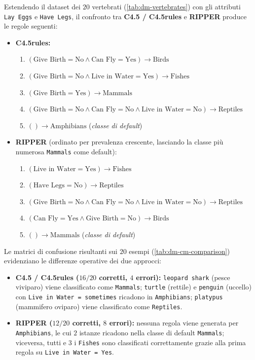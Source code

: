 Estendendo il dataset dei $20$ vertebrati (\autoref{tab:dm-vertebrates}) con gli attributi \texttt{Lay Eggs} e \texttt{Have Legs}, il confronto tra \textbf{C4.5 / C4.5rules} e \textbf{RIPPER} produce le regole seguenti:
\begin{itemize}
    \item \textbf{C4.5rules:}
    \begin{enumerate}
        \item $(\text{Give Birth}=\text{No} \wedge \text{Can Fly}=\text{Yes}) \rightarrow \text{Birds}$
        \item $(\text{Give Birth}=\text{No} \wedge \text{Live in Water}=\text{Yes}) \rightarrow \text{Fishes}$
        \item $(\text{Give Birth}=\text{Yes}) \rightarrow \text{Mammals}$
        \item $(\text{Give Birth}=\text{No} \wedge \text{Can Fly}=\text{No} \wedge \text{Live in Water}=\text{No}) \rightarrow \text{Reptiles}$
        \item $() \rightarrow \text{Amphibians}$ \quad (\textit{classe di default})
    \end{enumerate}
    \item \textbf{RIPPER} (ordinato per prevalenza crescente, lasciando la classe pi\`u numerosa \texttt{Mammals} come default):
    \begin{enumerate}
        \item $(\text{Live in Water}=\text{Yes}) \rightarrow \text{Fishes}$
        \item $(\text{Have Legs}=\text{No}) \rightarrow \text{Reptiles}$
        \item $(\text{Give Birth}=\text{No} \wedge \text{Can Fly}=\text{No} \wedge \text{Live in Water}=\text{No}) \rightarrow \text{Reptiles}$
        \item $(\text{Can Fly}=\text{Yes} \wedge \text{Give Birth}=\text{No}) \rightarrow \text{Birds}$
        \item $() \rightarrow \text{Mammals}$ \quad (\textit{classe di default})
    \end{enumerate}
\end{itemize}

Le matrici di confusione risultanti sui $20$ esempi (\autoref{tab:dm-cm-comparison}) evidenziano le differenze operative dei due approcci:
\begin{itemize}
    \item \textbf{C4.5 / C4.5rules ($16/20$ corretti, $4$ errori):} \texttt{leopard shark} (pesce viviparo) viene classificato come \texttt{Mammals}; \texttt{turtle} (rettile) e \texttt{penguin} (uccello) con \texttt{Live in Water = sometimes} ricadono in \texttt{Amphibians}; \texttt{platypus} (mammifero oviparo) viene classificato come \texttt{Reptiles}.
    \item \textbf{RIPPER ($12/20$ corretti, $8$ errori):} nessuna regola viene generata per \texttt{Amphibians}, le cui $2$ istanze ricadono nella classe di default \texttt{Mammals}; viceversa, tutti e $3$ i \texttt{Fishes} sono classificati correttamente grazie alla prima regola su \texttt{Live in Water = Yes}.
\end{itemize}

